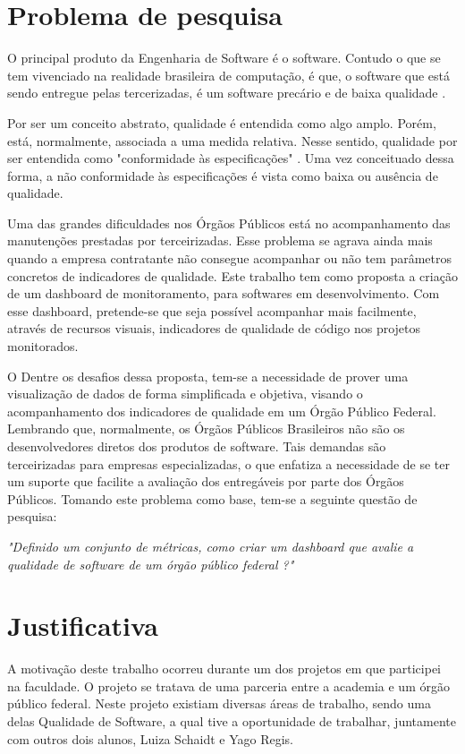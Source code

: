 \section{Problema de pesquisa}
O principal produto da Engenharia de Software é o software. Contudo o que se tem vivenciado na realidade brasileira de computação, é que, o software que está sendo entregue pelas tercerizadas, é um software precário e de baixa qualidade \cite{schnaider_uma_2004}.

Por ser um conceito abstrato, qualidade é entendida como algo amplo. Porém, está, normalmente, associada a uma medida relativa. Nesse sentido, qualidade por ser entendida como "conformidade às especificações" \cite{crosby}. Uma vez conceituado dessa forma, a não conformidade às especificações é vista como baixa ou ausência de qualidade.

Uma das grandes dificuldades nos Órgãos Públicos está no acompanhamento das manutenções prestadas por terceirizadas. Esse problema se agrava ainda mais quando a empresa contratante não consegue acompanhar ou não tem parâmetros concretos de indicadores de qualidade.
Este trabalho tem como proposta a criação de um dashboard de monitoramento, para softwares em desenvolvimento. Com esse dashboard, pretende-se que seja possível acompanhar mais facilmente, através de recursos visuais, indicadores de qualidade de código nos projetos monitorados.

O Dentre os desafios dessa proposta, tem-se a necessidade de prover uma visualização de dados de forma simplificada e objetiva, visando o acompanhamento dos indicadores de qualidade em um Órgão Público Federal.  Lembrando que, normalmente, os Órgãos Públicos Brasileiros não são os desenvolvedores diretos dos produtos de software. Tais demandas são terceirizadas para empresas especializadas, o que enfatiza a necessidade de se ter um suporte que facilite a avaliação dos entregáveis por parte dos Órgãos Públicos. Tomando este problema como base, tem-se a seguinte questão de pesquisa:
	
	\begin{center}
	\textit{"Definido um conjunto de métricas, como criar um dashboard que avalie a qualidade de software de um órgão público federal ?"}	
	\end{center}

\section{Justificativa}
	A motivação deste trabalho ocorreu durante um dos projetos em que participei na faculdade.  O projeto se tratava de uma parceria entre a academia e um órgão público federal. Neste projeto existiam diversas áreas de trabalho, sendo uma delas Qualidade de Software, a qual tive a oportunidade de trabalhar, juntamente com outros dois alunos, Luiza Schaidt e Yago Regis.
	
